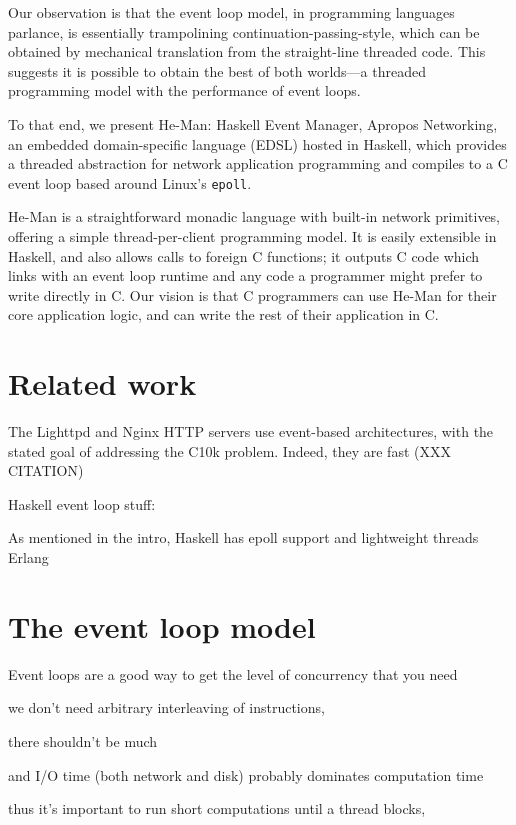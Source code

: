 \documentclass[preprint,11pt]{sigplanconf}
\renewcommand{\t}{\texttt}
\begin{document}
Our observation is that the event loop model, in programming languages parlance,
is essentially trampolining continuation-passing-style, which can be obtained by
mechanical translation from the straight-line threaded code. This suggests it is
possible to obtain the best of both worlds---a threaded programming model with
the performance of event loops. 

To that end, we present He-Man: Haskell Event Manager, Apropos Networking, an
embedded domain-specific language (EDSL) hosted in Haskell, which provides a
threaded abstraction for network application programming and compiles to a C
event loop based around Linux's \t{epoll}.

He-Man is a straightforward monadic language with built-in network primitives,
offering a simple thread-per-client programming model. It is easily extensible
in Haskell, and also allows calls to foreign C functions; it outputs C code
which links with an event loop runtime and any code a programmer might prefer to
write directly in C. Our vision is that C programmers can use He-Man for their
core application logic, and can write the rest of their application in C. 

\section{Related work}

The Lighttpd \cite{Lighttpd} and Nginx \cite{Nginx} HTTP servers use event-based
architectures, with the stated goal of addressing the C10k problem. Indeed, they
are fast (XXX CITATION)

Haskell event loop stuff: \cite{LiZdancewic}

As mentioned in the intro,
Haskell has epoll support and lightweight threads
Erlang

\section{The event loop model}



Event loops are a good way to get the level of concurrency that you need

we don't need arbitrary interleaving of instructions, 


there shouldn't be much

and I/O time (both network and disk) probably dominates computation time

thus it's important to run short computations until a thread blocks, 
\end{document}

